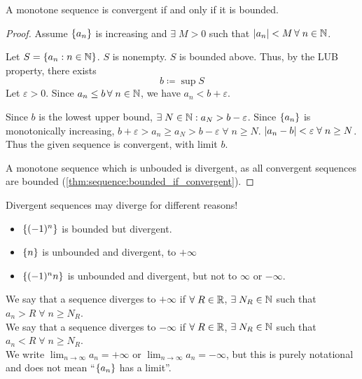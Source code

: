 \begin{thm} \label{thm:sequence:MCT}
    A monotone sequence is convergent if and only if it is bounded.
\end{thm}
\begin{proof}
    Assume $\set{a_{n}}$ is increasing and $\exists\; M > 0$ such that $\abs{a_{n}} < M \,\forall\; n \in \N$.

    Let $S = \set{a_{n} : n \in \N}$.
    $S$ is nonempty. $S$ is bounded above.
    Thus, by the LUB property, there exists \[
        b \coloneqq \sup S
    \] Let $\varepsilon > 0$.
    Since $a_{n} \leq b \,\forall\; n \in \mathbb{N}$, we have $a_{n} < b + \varepsilon$.

    Since $b$ is the lowest upper bound, $\exists\; N \in \mathbb{N} : a_{N} > b - \varepsilon$.
    Since $\set{a_{n}}$ is monotonically increasing, $b + \varepsilon > a_{n} \geq a_{N} > b - \varepsilon \;\forall\; n \geq N$.
    $\abs{a_{n} - b} < \varepsilon \;\forall\; n \geq N$. Thus the given sequence is convergent, with limit $b$.

    A monotone sequence which is unbouded is divergent, as all convergent sequences are bounded (\cref{thm:sequence:bounded_if_convergent}).
\end{proof}

\begin{rem}[Warning!]
    Divergent sequences may diverge for different reasons!
    \begin{itemize}
        \item $\set{(-1)^{n}}$ is bounded but divergent.
        \item $\set{n}$ is unbounded and divergent, to $+\infty$
        \item $\set{(-1)^{n}n}$ is unbounded and divergent, but not to $\infty$ or $-\infty$.
    \end{itemize}
\end{rem}
\begin{defn} \label{defn:sequence:diverging_to_infinity}
    We say that a sequence diverges to $+\infty$ if $\forall\; R \in \mathbb{R}$, $\exists\; N_{R} \in \mathbb{N}$ such that $a_{n} > R \;\forall\; n \geq N_{R}$. \\
    We say that a sequence diverges to $-\infty$ if $\forall\; R \in \mathbb{R}$, $\exists\; N_{R} \in \mathbb{N}$ such that $a_{n} < R \;\forall\; n \geq N_{R}$. \\
    We write $\lim_{n \to \infty} a_{n} = +\infty$ or $\lim_{n \to \infty} a_{n} = -\infty$, but this is purely notational and does not mean ``$\set{a_{n}}$ has a limit''.
\end{defn}
